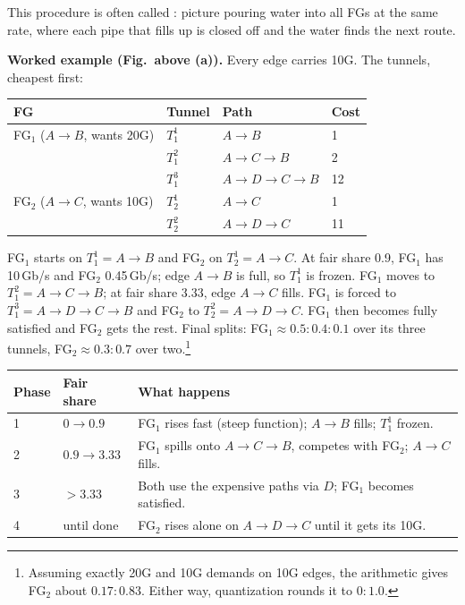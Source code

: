This procedure is often called : picture pouring water into all FGs at the same rate, where each pipe that fills up is closed off and the water finds the next route.


\textbf{Worked example (Fig.\ above (a)).} Every edge carries 10G. The tunnels, cheapest first:
\begin{center}
\begin{tabular}{llll}
\hline
FG & Tunnel & Path & Cost \\
\hline
FG$_1$ ($A\to B$, wants 20G) & $T_1^1$ & $A\to B$ & 1 \\
 & $T_1^2$ & $A\to C\to B$ & 2 \\
 & $T_1^3$ & $A\to D\to C\to B$ & 12 \\
FG$_2$ ($A\to C$, wants 10G) & $T_2^1$ & $A\to C$ & 1 \\
 & $T_2^2$ & $A\to D\to C$ & 11 \\
\hline
\end{tabular}
\end{center}

FG$_1$ starts on $T_1^1=A\to B$ and FG$_2$ on $T_2^1=A\to C$. At fair share 0.9, FG$_1$ has 10\,Gb/s and FG$_2$ 0.45\,Gb/s; edge $A\to B$ is full, so $T_1^1$ is frozen. FG$_1$ moves to $T_1^2=A\to C\to B$; at fair share 3.33, edge $A\to C$ fills. FG$_1$ is forced to $T_1^3=A\to D\to C\to B$ and FG$_2$ to $T_2^2=A\to D\to C$. FG$_1$ then becomes fully satisfied and FG$_2$ gets the rest. Final splits: FG$_1 \approx 0.5{:}0.4{:}0.1$ over its three tunnels, FG$_2 \approx 0.3{:}0.7$ over two.\footnote{Assuming exactly 20G and 10G demands on 10G edges, the arithmetic gives FG$_2$ about $0.17{:}0.83$. Either way, quantization rounds it to $0{:}1.0$.}

\begin{center}
\begin{tabular}{lll}
\hline
Phase & Fair share & What happens \\
\hline
1 & $0 \to 0.9$ & FG$_1$ rises fast (steep function); $A\to B$ fills; $T_1^1$ frozen. \\
2 & $0.9 \to 3.33$ & FG$_1$ spills onto $A\to C\to B$, competes with FG$_2$; $A\to C$ fills. \\
3 & $> 3.33$ & Both use the expensive paths via $D$; FG$_1$ becomes satisfied. \\
4 & until done & FG$_2$ rises alone on $A\to D\to C$ until it gets its 10G. \\
\hline
\end{tabular}
\end{center}

